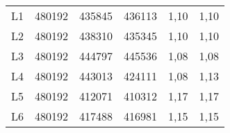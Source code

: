 \begin{center}
\begin{longtable}{cccccc}
    L1    & 480192 & 435845 & 436113 & 1,10  & 1,10 \\
    L2    & 480192 & 438310 & 435345 & 1,10  & 1,10 \\
    L3    & 480192 & 444797 & 445536 & 1,08  & 1,08 \\
    L4    & 480192 & 443013 & 424111 & 1,08  & 1,13 \\
    L5    & 480192 & 412071 & 410312 & 1,17  & 1,17 \\
    L6    & 480192 & 417488 & 416981 & 1,15  & 1,15 \\
\end{longtable}
\end{center}

%  
% 
% 


